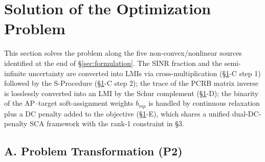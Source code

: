 \documentclass[12pt,a4paper]{article}
\begin{document}
\section{Solution of the Optimization Problem}\label{sec:relaxation}

This section solves the problem along the five non-convex/nonlinear sources identified at the end of \S\ref{sec:formulation}. The SINR fraction and the semi-infinite uncertainty are converted into LMIs via cross-multiplication (\S\ref{sec:relaxation}-C step 1) followed by the S-Procedure (\S\ref{sec:relaxation}-C step 2); the trace of the PCRB matrix inverse is losslessly converted into an LMI by the Schur complement (\S\ref{sec:relaxation}-D); the binarity of the AP--target soft-assignment weights $b_{mp}$ is handled by continuous relaxation plus a DC penalty added to the objective (\S\ref{sec:relaxation}-E), which shares a unified dual-DC-penalty SCA framework with the rank-1 constraint in \S3.

\subsection*{A. Problem Transformation (P2)}
\end{document}
